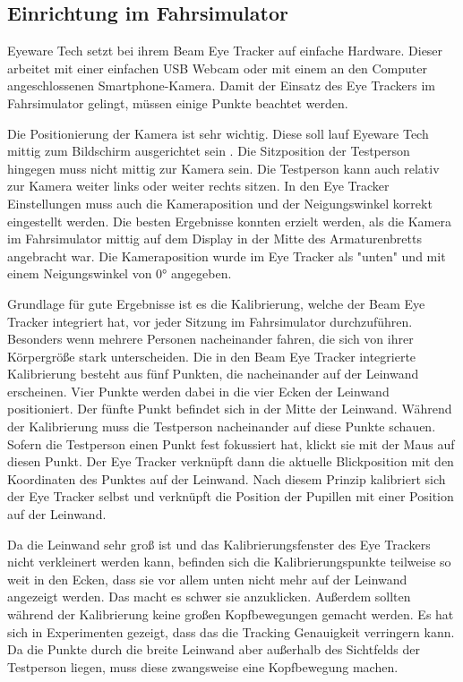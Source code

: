 \subsection{Einrichtung im Fahrsimulator}

Eyeware Tech setzt bei ihrem Beam Eye Tracker auf einfache Hardware. Dieser arbeitet mit einer einfachen USB Webcam oder mit einem an den Computer angeschlossenen Smartphone-Kamera. Damit der Einsatz des Eye Trackers im Fahrsimulator gelingt, müssen einige Punkte beachtet werden. 

Die Positionierung der Kamera ist sehr wichtig. Diese soll lauf Eyeware Tech mittig zum Bildschirm ausgerichtet sein \cite{lit_software_beam_eyetracker}. Die Sitzposition der Testperson hingegen muss nicht mittig zur Kamera sein. Die Testperson kann auch relativ zur Kamera weiter links oder weiter rechts sitzen.
In den Eye Tracker Einstellungen muss auch die Kameraposition und der Neigungswinkel korrekt eingestellt werden. Die besten Ergebnisse konnten erzielt werden, als die Kamera im Fahrsimulator mittig auf dem Display in der Mitte des Armaturenbretts angebracht war. Die Kameraposition wurde im Eye Tracker als "unten" und mit einem Neigungswinkel von 0° angegeben.

Grundlage für gute Ergebnisse ist es die Kalibrierung, welche der Beam Eye Tracker integriert hat, vor jeder Sitzung im Fahrsimulator durchzuführen. Besonders wenn mehrere Personen nacheinander fahren, die sich von ihrer Körpergröße stark unterscheiden. Die in den Beam Eye Tracker integrierte Kalibrierung besteht aus fünf Punkten, die nacheinander auf der Leinwand erscheinen. Vier Punkte werden dabei in die vier Ecken der Leinwand positioniert. Der fünfte Punkt befindet sich in der Mitte der Leinwand. Während der Kalibrierung muss die Testperson nacheinander auf diese Punkte schauen. Sofern die Testperson einen Punkt fest fokussiert hat, klickt sie mit der Maus auf diesen Punkt. Der Eye Tracker verknüpft dann die aktuelle Blickposition mit den Koordinaten des Punktes auf der Leinwand. Nach diesem Prinzip kalibriert sich der Eye Tracker selbst und verknüpft die Position der Pupillen mit einer Position auf der Leinwand.

Da die Leinwand sehr groß ist und das Kalibrierungsfenster des Eye Trackers nicht verkleinert werden kann, befinden sich die Kalibrierungspunkte teilweise so weit in den Ecken, dass sie vor allem unten nicht mehr auf der Leinwand angezeigt werden. Das macht es schwer sie anzuklicken. Außerdem sollten während der Kalibrierung keine großen Kopfbewegungen gemacht werden. Es hat sich in Experimenten gezeigt, dass das die Tracking Genauigkeit verringern kann. Da die Punkte durch die breite Leinwand aber außerhalb des Sichtfelds der Testperson liegen, muss diese zwangsweise eine Kopfbewegung machen. 

